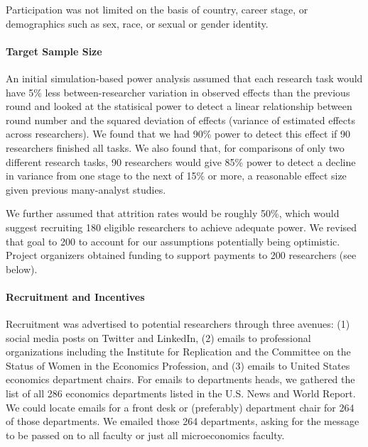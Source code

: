 \documentclass[
  letterpaper,
  DIV=11,
  numbers=noendperiod]{scrartcl}
\let\oldparagraph\paragraph
\renewcommand{\paragraph}[1]{\oldparagraph{#1}\mbox{}}
\begin{document}
Participation was not limited on the basis of country, career stage, or
demographics such as sex, race, or sexual or gender identity.

\hypertarget{target-sample-size}{%
\paragraph{Target Sample Size}\label{target-sample-size}}

An initial simulation-based power analysis assumed that each research
task would have 5\% less between-researcher variation in observed
effects than the previous round and looked at the statisical power to
detect a linear relationship between round number and the squared
deviation of effects (variance of estimated effects across researchers).
We found that we had 90\% power to detect this effect if 90 researchers
finished all tasks. We also found that, for comparisons of only two
different research tasks, 90 researchers would give 85\% power to detect
a decline in variance from one stage to the next of 15\% or more, a
reasonable effect size given previous many-analyst studies.

We further assumed that attrition rates would be roughly 50\%, which
would suggest recruiting 180 eligible researchers to achieve adequate
power. We revised that goal to 200 to account for our assumptions
potentially being optimistic. Project organizers obtained funding to
support payments to 200 researchers (see below).

\hypertarget{recruitment-and-incentives}{%
\paragraph{Recruitment and
Incentives}\label{recruitment-and-incentives}}

Recruitment was advertised to potential researchers through three
avenues: (1) social media posts on Twitter and LinkedIn, (2) emails to
professional organizations including the Institute for Replication and
the Committee on the Status of Women in the Economics Profession, and
(3) emails to United States economics department chairs. For emails to
departments heads, we gathered the list of all 286 economics departments
listed in the U.S. News and World Report. We could locate emails for a
front desk or (preferably) department chair for 264 of those
departments. We emailed those 264 departments, asking for the message to
be passed on to all faculty or just all microeconomics faculty.
\end{document}
